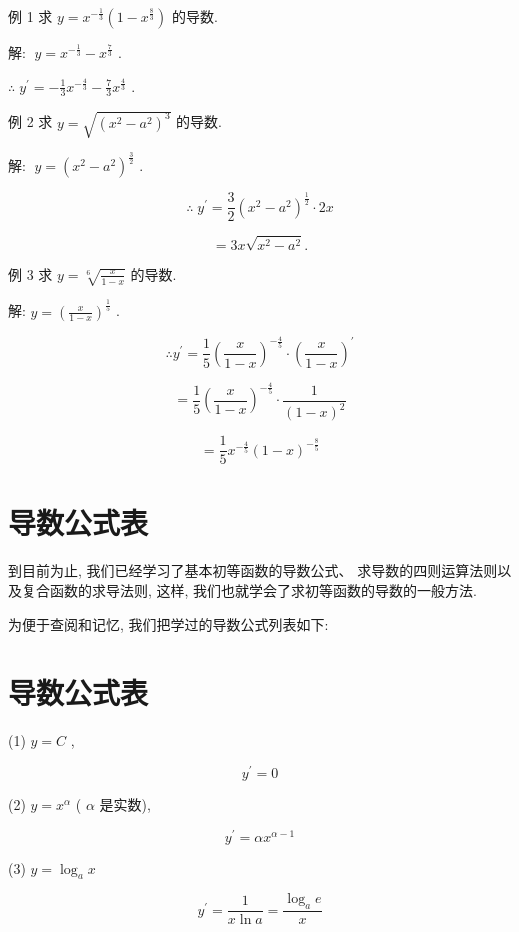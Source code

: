 \documentclass[10pt]{article}
\begin{document}
例 1 求 \(y = {x}^{-\frac{1}{3}}\left( {1 - {x}^{\frac{8}{3}}}\right)\) 的导数.

解: \(\;y = {x}^{-\frac{1}{3}} - {x}^{\frac{7}{3}}\) .

\(\therefore \;{y}^{\prime } = - \frac{1}{3}{x}^{-\frac{4}{3}} - \frac{7}{3}{x}^{\frac{4}{3}}\) .

例 2 求 \(y = \sqrt{{\left( {x}^{2} - {a}^{2}\right) }^{3}}\) 的导数.

解: \(\;y = {\left( {x}^{2} - {a}^{2}\right) }^{\frac{3}{2}}\) .

\[
\therefore \;{y}^{\prime } = \frac{3}{2}{\left( {x}^{2} - {a}^{2}\right) }^{\frac{1}{2}} \cdot {2x}
\]

\[
= {3x}\sqrt{{x}^{2} - {a}^{2}}\text{.}
\]

例 3 求 \(y = \sqrt[6]{\frac{x}{1 - x}}\) 的导数.

解: \(y = {\left( \frac{x}{1 - x}\right) }^{\frac{1}{5}}\) .

\[
\therefore {y}^{\prime } = \frac{1}{5}{\left( \frac{x}{1 - x}\right) }^{-\frac{4}{5}} \cdot {\left( \frac{x}{1 - x}\right) }^{\prime }
\]

\[
= \frac{1}{5}{\left( \frac{x}{1 - x}\right) }^{-\frac{4}{5}} \cdot \frac{1}{{\left( 1 - x\right) }^{2}}
\]

\[
= \frac{1}{5}{x}^{-\frac{4}{5}}{\left( 1 - x\right) }^{-\frac{8}{5}}
\]

\section*{导数公式表}

到目前为止, 我们已经学习了基本初等函数的导数公式、 求导数的四则运算法则以及复合函数的求导法则, 这样, 我们也就学会了求初等函数的导数的一般方法.

为便于查阅和记忆, 我们把学过的导数公式列表如下:

\section*{导数公式表}

(1) \(y = C\) ,

\[
{y}^{\prime } = 0
\]

(2) \(y = {x}^{\alpha }\) ( \(\alpha\) 是实数),

\[
{y}^{\prime } = \alpha {x}^{\alpha - 1}
\]

(3) \(y = {\log }_{a}x\)

\[
{y}^{\prime } = \frac{1}{x\ln a} = \frac{{\log }_{a}e}{x}
\]
\end{document}
